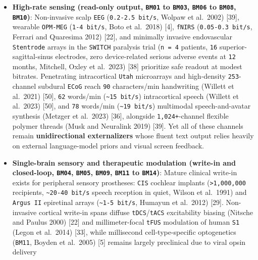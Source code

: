 \documentclass[10pt,letterpaper]{article}
\providecommand{\tightlist}{\setlength{\itemsep}{1pt}\setlength{\parskip}{0pt}}
\begin{document}
\begin{itemize}
\tightlist
\item
  \textbf{High-rate sensing (read-only output, \texttt{BM01} to
  \texttt{BM03}, \texttt{BM06} to \texttt{BM08}, \texttt{BM10})}:
  Non-invasive scalp \texttt{EEG} (\texttt{0.\allowbreak{}2-\allowbreak{}2.\allowbreak{}5\ bit/\allowbreak{}s}, Wolpaw et
  al.~2002) {[}39{]}, wearable \texttt{OPM-MEG} (\texttt{1-\allowbreak{}4\ bit/\allowbreak{}s},
  Boto et al.~2018) {[}4{]}, \texttt{fNIRS} (\texttt{0.\allowbreak{}05-\allowbreak{}0.\allowbreak{}3\ bit/\allowbreak{}s},
  Ferrari and Quaresima 2012) {[}22{]}, and minimally invasive
  endovascular \texttt{Stentrode} arrays in the \texttt{SWITCH}
  paralysis trial (\texttt{n\ =\ 4} patients, \texttt{16}
  superior-sagittal-sinus electrodes, zero device-related serious
  adverse events at \texttt{12} months, Mitchell, Oxley et al.~2023)
  {[}38{]} prioritize safe readout at modest bitrates. Penetrating
  intracortical \texttt{Utah} microarrays and high-density
  \texttt{253}-channel subdural \texttt{ECoG} reach \texttt{90}
  characters/min handwriting (Willett et al.~2021) {[}50{]}, \texttt{62}
  words/min (\texttt{\textasciitilde{}15\ bit/s}) intracortical speech
  (Willett et al.~2023) {[}50{]}, and \texttt{78} words/min
  (\texttt{\textasciitilde{}19\ bit/s}) multimodal speech-and-avatar
  synthesis (Metzger et al.~2023) {[}36{]}, alongside
  \texttt{1,024+}-channel flexible polymer threads (Musk and Neuralink
  2019) {[}39{]}. Yet all of these channels remain
  \textbf{unidirectional externalizers} whose fluent text output relies
  heavily on external language-model priors and visual screen feedback.
\item
  \textbf{Single-brain sensory and therapeutic modulation (write-in and
  closed-loop, \texttt{BM04}, \texttt{BM05}, \texttt{BM09},
  \texttt{BM11} to \texttt{BM14})}: Mature clinical write-in exists for
  peripheral sensory prostheses: \texttt{CIS} cochlear implants
  (\texttt{\textgreater{}1,000,000} recipients,
  \texttt{\textasciitilde{}20-40\ bit/s} speech reception in quiet,
  Wilson et al.~1991) and \texttt{Argus\ II} epiretinal arrays
  (\texttt{\textasciitilde{}1-5\ bit/s}, Humayun et al.~2012) {[}29{]}.
  Non-invasive cortical write-in spans diffuse
  \texttt{tDCS}/\allowbreak{}\texttt{tACS} excitability biasing (Nitsche and Paulus
  2000) {[}22{]} and millimeter-focal \texttt{tFUS} modulation of human
  \texttt{S1} (Legon et al.~2014) {[}33{]}, while millisecond
  cell-type-specific optogenetics (\texttt{BM11}, Boyden et al.~2005)
  {[}5{]} remains largely preclinical due to viral opsin delivery

\end{itemize}
\end{document}
